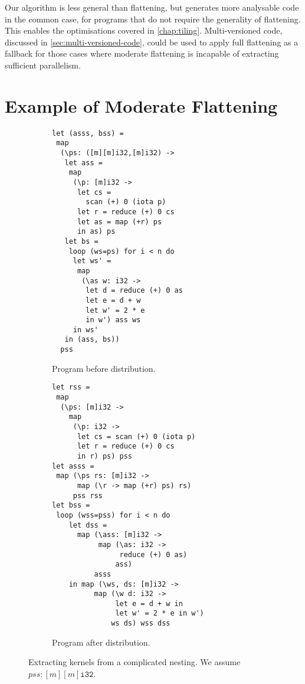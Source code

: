 Our algorithm is less general than flattening, but generates more
analysable code in the common case, for programs that do not require
the generality of flattening.  This enables the optimisations covered
in \cref{chap:tiling}.  Multi-versioned code, discussed in
\cref{sec:multi-versioned-code}, could be used to apply full
flattening as a fallback for those cases where moderate flattening is
incapable of extracting sufficient parallelism.

\section{Example of Moderate Flattening}
\label{sec:kernel-extraction}

\begin{figure}
\begin{subfigure}{0.48\columnwidth}
\begin{lstlisting}[basicstyle=\scriptsize\ttfamily,numbers=none]
let (asss, bss) =
 map
  (\ps: ([m][m]i32,[m]i32) ->
   let ass =
    map
     (\p: [m]i32 ->
      let cs =
        scan (+) 0 (iota p)
      let r = reduce (+) 0 cs
      let as = map (+r) ps
      in as) ps
   let bs =
    loop (ws=ps) for i < n do
     let ws' =
      map
       (\as w: i32 ->
        let d = reduce (+) 0 as
        let e = d + w
        let w' = 2 * e
        in w') ass ws
     in ws'
   in (ass, bs))
  pss
\end{lstlisting}
\caption{Program before distribution.}
\label{fig:before-distrib}
\end{subfigure}
\begin{subfigure}{0.49\columnwidth}
\begin{lstlisting}[basicstyle=\scriptsize\ttfamily,numbers=none]
let rss =
 map
  (\ps: [m]i32 ->
    map
     (\p: i32 ->
      let cs = scan (+) 0 (iota p)
      let r = reduce (+) 0 cs
      in r) ps) pss
let asss =
 map (\ps rs: [m]i32 ->
      map (\r -> map (+r) ps) rs)
     pss rss
let bss =
 loop (wss=pss) for i < n do
    let dss =
      map (\ass: [m]i32 ->
           map (\as: i32 ->
                reduce (+) 0 as)
               ass)
          asss
    in map (\ws, ds: [m]i32 ->
          map (\w d: i32 ->
               let e = d + w in
               let w' = 2 * e in w')
              ws ds) wss dss
\end{lstlisting}
\caption{Program after distribution.}
\label{fig:after-result}
\end{subfigure}
\caption{Extracting kernels from a complicated nesting.  We assume
  $pss : [m][m]\texttt{i32}$.}
\end{figure}

